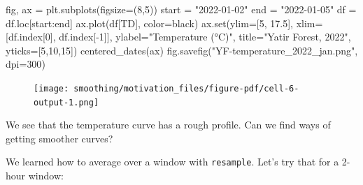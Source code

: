 \documentclass[
  letterpaper,
  DIV=11,
  numbers=noendperiod,
  oneside]{scrreprt}
\newenvironment{Shaded}{\begin{snugshade}}{\end{snugshade}}
\newcommand{\BuiltInTok}[1]{\textcolor[rgb]{0.00,0.23,0.31}{#1}}
\newcommand{\DecValTok}[1]{\textcolor[rgb]{0.68,0.00,0.00}{#1}}
\newcommand{\FloatTok}[1]{\textcolor[rgb]{0.68,0.00,0.00}{#1}}
\newcommand{\NormalTok}[1]{\textcolor[rgb]{0.00,0.23,0.31}{#1}}
\newcommand{\OperatorTok}[1]{\textcolor[rgb]{0.37,0.37,0.37}{#1}}
\newcommand{\StringTok}[1]{\textcolor[rgb]{0.13,0.47,0.30}{#1}}
\begin{document}
\begin{Shaded}
\begin{Highlighting}[]
\NormalTok{fig, ax }\OperatorTok{=}\NormalTok{ plt.subplots(figsize}\OperatorTok{=}\NormalTok{(}\DecValTok{8}\NormalTok{,}\DecValTok{5}\NormalTok{))}
\NormalTok{start }\OperatorTok{=} \StringTok{"2022{-}01{-}02"}
\NormalTok{end }\OperatorTok{=} \StringTok{"2022{-}01{-}05"}
\NormalTok{df }\OperatorTok{=}\NormalTok{ df.loc[start:end]}
\NormalTok{ax.plot(df[}\StringTok{\textquotesingle{}TD\textquotesingle{}}\NormalTok{], color}\OperatorTok{=}\StringTok{\textquotesingle{}black\textquotesingle{}}\NormalTok{)}
\NormalTok{ax.}\BuiltInTok{set}\NormalTok{(ylim}\OperatorTok{=}\NormalTok{[}\DecValTok{5}\NormalTok{, }\FloatTok{17.5}\NormalTok{],}
\NormalTok{       xlim}\OperatorTok{=}\NormalTok{[df.index[}\DecValTok{0}\NormalTok{], df.index[}\OperatorTok{{-}}\DecValTok{1}\NormalTok{]],}
\NormalTok{       ylabel}\OperatorTok{=}\StringTok{"Temperature (°C)"}\NormalTok{,}
\NormalTok{       title}\OperatorTok{=}\StringTok{"Yatir Forest, 2022"}\NormalTok{,}
\NormalTok{       yticks}\OperatorTok{=}\NormalTok{[}\DecValTok{5}\NormalTok{,}\DecValTok{10}\NormalTok{,}\DecValTok{15}\NormalTok{])}
\NormalTok{centered\_dates(ax)}
\NormalTok{fig.savefig(}\StringTok{"YF{-}temperature\_2022\_jan.png"}\NormalTok{, dpi}\OperatorTok{=}\DecValTok{300}\NormalTok{)}
\end{Highlighting}
\end{Shaded}

\begin{figure}[H]

{\centering \texttt{[image: smoothing/motivation\_files/figure-pdf/cell-6-output-1.png]}

}

\end{figure}

We see that the temperature curve has a rough profile. Can we find ways
of getting smoother curves?

We learned how to average over a window with \texttt{resample}. Let's
try that for a 2-hour window:
\end{document}

